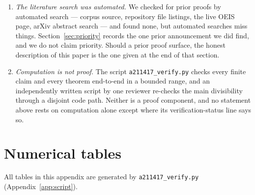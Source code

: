 \documentclass[11pt]{article}
\theoremstyle{plain}
\theoremstyle{definition}
\theoremstyle{remark}
\numberwithin{equation}{section}
\begin{document}
\begin{enumerate}
\item \emph{The literature search was automated.} We checked for prior proofs by automated search
--- corpus source, repository file listings, the live OEIS page, arXiv abstract search --- and
found none, but automated searches miss things. Section~\ref{sec:priority} records the one prior
announcement we did find, and we do not claim priority. Should a prior proof surface, the honest
description of this paper is the one given at the end of that section.

\item \emph{Computation is not proof.} The script \texttt{a211417\_verify.py} checks every finite
claim and every theorem end-to-end in a bounded range, and an independently written script by one
reviewer re-checks the main divisibility through a disjoint code path. Neither is a proof
component, and no statement above rests on computation alone except where its verification-status
line says so.

\end{enumerate}

\appendix
\setcounter{table}{0}
\renewcommand{\thetable}{A.\arabic{table}}
\renewcommand{\theHtable}{appendix.\arabic{table}}%

\section{Numerical tables}
\label{app:tables}

All tables in this appendix are generated by \texttt{a211417\_verify.py}
(Appendix~\ref{app:script}).
\end{document}
